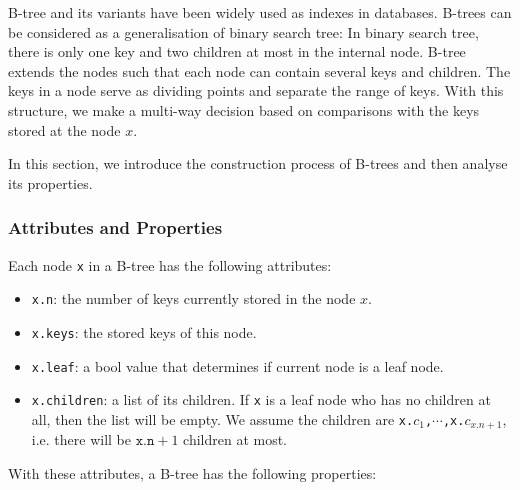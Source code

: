 B-tree and its variants have been widely used as indexes in databases. B-trees can be considered as a generalisation of binary search tree: In binary search tree, there is only one key and two children at most in the internal node. B-tree extends the nodes such that each node can contain several keys and children. The keys in a node serve as dividing points and separate the range of keys. With this structure, we make a multi-way decision based on comparisons with the keys stored at the node $x$.

In this section, we introduce the construction process of B-trees and then analyse its properties.

\subsubsection{Attributes and Properties}

Each node \texttt{x} in a B-tree has the following attributes:

\begin{itemize}
\item \texttt{x.n}: the number of keys currently stored in the node $x$.
\item \texttt{x.keys}: the stored keys of this node.
\item \texttt{x.leaf}: a bool value that determines if current node is a leaf node.
\item \texttt{x.children}: a list of its children. If \texttt{x} is a leaf node who has no children at all, then the list will be empty. We assume the children are \texttt{x.$c_1$,$\cdots$,x.$c_{x.n+1}$}, i.e. there will be $\texttt{x.n}+1$ children at most.
\end{itemize}

\noindent
With these attributes, a B-tree has the following properties:


